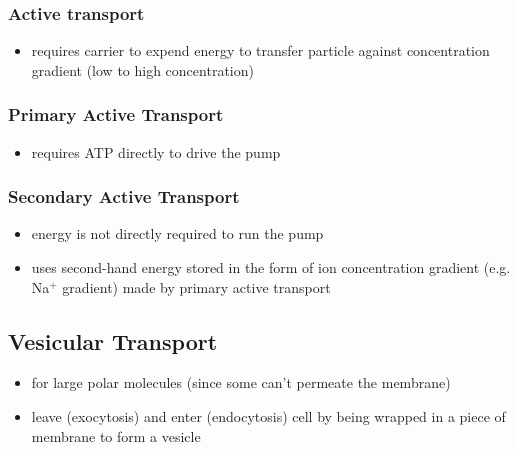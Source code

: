 \documentclass[10pt]{article}
\begin{document}
\subsubsection{Active transport}
\begin{itemize}
    \item requires carrier to expend energy to transfer particle against concentration gradient (low to high concentration)
\end{itemize}
\subsubsection*{Primary Active Transport}
\begin{itemize}
    \item requires ATP directly to drive the pump
\end{itemize}
\subsubsection*{Secondary Active Transport}
\begin{itemize}
    \item energy is not directly required to run the pump
    \item uses second-hand energy stored in the form of ion concentration gradient (e.g. Na$^+$ gradient) made by primary active transport
\end{itemize}

\subsection{Vesicular Transport}
\begin{itemize}
    \item for large polar molecules (since some can't permeate the membrane)
    \item leave (exocytosis) and enter (endocytosis) cell by being wrapped in a piece of membrane to form a vesicle
\end{itemize}
\end{document}
